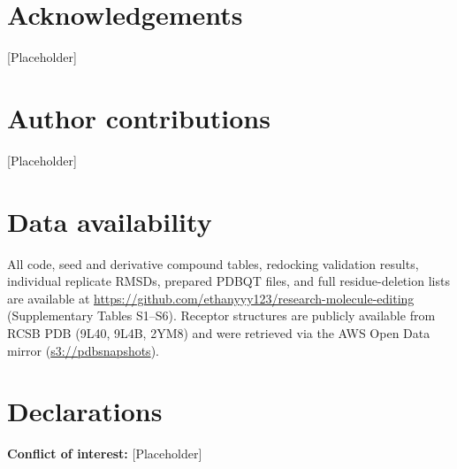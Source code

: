 \documentclass[global,twocolumn]{svjour}
\begin{document}
\section*{Acknowledgements}
[Placeholder]

\section*{Author contributions}
[Placeholder]

\section*{Data availability}
All code, seed and derivative compound tables, redocking validation results,
individual replicate RMSDs, prepared PDBQT files, and full residue-deletion
lists are available at \url{https://github.com/ethanyyy123/research-molecule-editing}
(Supplementary Tables S1--S6). Receptor structures are publicly available
from RCSB PDB (9L40, 9L4B, 2YM8) and were retrieved via the AWS Open Data
mirror (\url{s3://pdbsnapshots}).

\section*{Declarations}
\textbf{Conflict of interest:} [Placeholder]



\end{document}
